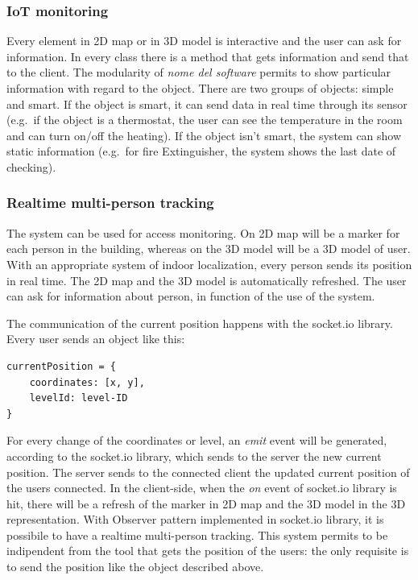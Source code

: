\documentclass{sig-alternate}
\begin{document}
\subsubsection{IoT monitoring}\label{iot-monitoring}

Every element in 2D map or in 3D model is interactive and the user can
ask for information. In every class there is a method that gets
information and send that to the client. The modularity of \emph{nome
del software} permits to show particular information with regard to the
object. There are two groups of objects: simple and smart. If the object
is smart, it can send data in real time through its sensor (e.g.~if the
object is a thermostat, the user can see the temperature in the room and
can turn on/off the heating). If the object isn't smart, the system can
show static information (e.g.~for fire Extinguisher, the system shows
the last date of checking).

\subsubsection{Realtime multi-person tracking}\label{realtime-multi-person-tracking}

The system can be used for access monitoring. On 2D map will be a marker
for each person in the building, whereas on the 3D model will be a 3D
model of user. With an appropriate system of indoor localization, every
person sends its position in real time. The 2D map and the 3D model is
automatically refreshed. The user can ask for information about person,
in function of the use of the system.

The communication of the current position happens with the socket.io
library. Every user sends an object like this:

\begin{verbatim}
currentPosition = {
    coordinates: [x, y],
    levelId: level-ID  
}
\end{verbatim}

For every change of the coordinates or level, an \emph{emit} event will
be generated, according to the socket.io library, which sends to the
server the new current position. The server sends to the connected
client the updated current position of the users connected. In the
client-side, when the \emph{on} event of socket.io library is hit, there
will be a refresh of the marker in 2D map and the 3D model in the 3D
representation. With Observer pattern implemented in socket.io library,
it is possibile to have a realtime multi-person tracking. This system
permits to be indipendent from the tool that gets the position of the
users: the only requisite is to send the position like the object
described above.
\end{document}
